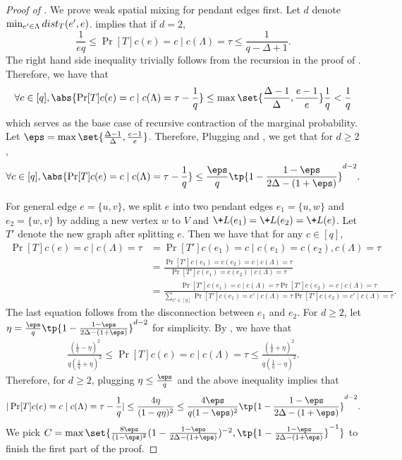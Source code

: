 \documentclass[a4paper,11pt]{article}
\begin{document}
\begin{proof}[Proof of ]
    We prove weak spatial mixing for pendant edges first.
    Let $d$ denote $\min_{e'\in \Lambda} \-{dist}_{T}(e',e)$.
     implies that if $d = 2$, 
    $$
        \frac{1}{eq}\leq \Pr[T]{c(e) = c\mid c(\Lambda) = \tau} \leq \frac 1{q-\Delta + 1}.
    $$
    The right hand side inequality trivially follows from the recursion in the proof of .
    Therefore, we have that
    \begin{align}\label{eq:base_case_WSM}
        \forall c\in [q], \abs{\Pr[T]{c(e) = c\mid c(\Lambda) = \tau} - \frac 1q} \leq \max\set{\frac{\Delta - 1}{\Delta}, \frac {e - 1}e}\frac 1q < \frac 1q
    \end{align}
    which serves as the base case of recursive contraction of the marginal probability.
    Let $\eps = \max\set{\frac{\Delta - 1}{\Delta}, \frac {e - 1}e}$.
    Therefore, Plugging  and , we get that for $d\geq 2$,
    \begin{align}\label{eq:WSM_decay}
        \forall c\in [q], \abs{\Pr[T]{c(e) = c\mid c(\Lambda) = \tau} - \frac 1q} \leq \frac{\eps}{q} \tp{1 - \frac{1 - \eps}{2\Delta - (1+\eps)}}^{d-2}.
    \end{align}


For general edge $e = \{u,v\}$, we split $e$ into two pendant edges $e_1 = \{u,w\}$ and $e_2 = \{w,v\}$ by adding a new vertex $w$ to $V$ and $\+L(e_1) = \+L(e_2) = \+L(e)$.
    Let $T'$ denote the new graph after splitting $e$. 
    Then we have that for any $c\in [q]$,
    \begin{align*}
        \Pr[T]{c(e) = c\mid c(\Lambda) = \tau} &= \Pr[T']{c(e_1) = c\mid c(e_1) = c(e_2), c(\Lambda) = \tau}
        \\&=\frac{\Pr[T']{c(e_1) = c(e_2) = c\mid c(\Lambda) = \tau}}{\Pr[T']{c(e_1) = c(e_2)\mid c(\Lambda) = \tau}}
        \\&= \frac{\Pr[T']{c(e_1) = c\mid c(\Lambda) = \tau}\Pr[T']{c(e_2) = c\mid c(\Lambda) = \tau}}{\sum_{c'\in[q]}\Pr[T']{c(e_1) = c'\mid c(\Lambda) = \tau}\Pr[T']{c(e_2) = c'\mid c(\Lambda) = \tau}}.
    \end{align*}
    The last equation follows from the disconnection between $e_1$ and $e_2$.
    For $d\geq 2$, let $\eta = \frac{\eps}{q} \tp{1 - \frac{1 - \eps}{2\Delta - (1+\eps)}}^{d-2}$ for simplicity.
    By , we have that
    \begin{align*}
        \frac{(\frac 1q - \eta)^2}{q(\frac 1q + \eta)^2} \leq \Pr[T]{c(e) = c\mid c(\Lambda) = \tau} \leq \frac{(\frac 1q + \eta)^2}{q(\frac 1q - \eta)^2}.
    \end{align*}
    Therefore, for $d\geq 2$, plugging $\eta \leq \frac{\eps}{q}$ and the above inequality implies that 
    $$
        |\Pr[T]{c(e) = c\mid c(\Lambda) = \tau} - \frac 1q| \leq \frac{4\eta}{(1 - q\eta)^2}\leq \frac{4\eps}{q(1-\eps)^2} \tp{1 - \frac{1 - \eps}{2\Delta - (1+\eps)}}^{d-2}.
    $$
    We pick $C = \max\set{\frac{8\eps}{(1-\eps)^2}(1 - \frac{1 - \eps}{2\Delta - (1+\eps)})^{-2}, \tp{1 - \frac{1 - \eps}{2\Delta - (1+\eps)}}^{-1} }$ to finish the first part of the proof.


\end{proof}
\end{document}
